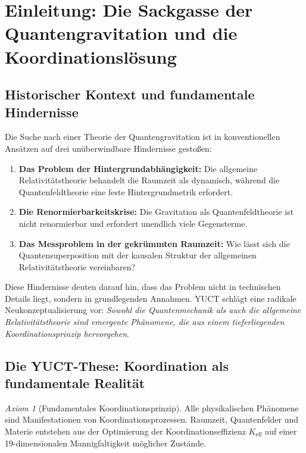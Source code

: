 \documentclass[12pt,a4paper]{article}
\theoremstyle{remark}
\newtheorem{axiom}[theorem]{Axiom}
\newcommand{\Keff}{K_{\mathrm{eff}}}
\begin{document}
	\tableofcontents
	\newpage
	
	\section{Einleitung: Die Sackgasse der Quantengravitation und die Koordinationslösung}
	\label{sec:introduction}
	
	\subsection{Historischer Kontext und fundamentale Hindernisse}
	
	Die Suche nach einer Theorie der Quantengravitation ist in konventionellen Ansätzen auf drei unüberwindbare Hindernisse gestoßen:
	
	\begin{enumerate}
		\item \textbf{Das Problem der Hintergrundabhängigkeit:} Die allgemeine Relativitätstheorie behandelt die Raumzeit als dynamisch, während die Quantenfeldtheorie eine feste Hintergrundmetrik erfordert.
		
		\item \textbf{Die Renormierbarkeitskrise:} Die Gravitation als Quantenfeldtheorie ist nicht renormierbar und erfordert unendlich viele Gegensterme.
		
		\item \textbf{Das Messproblem in der gekrümmten Raumzeit:} Wie lässt sich die Quantensuperposition mit der kausalen Struktur der allgemeinen Relativitätstheorie vereinbaren?
	\end{enumerate}
	
	Diese Hindernisse deuten darauf hin, dass das Problem nicht in technischen Details liegt, sondern in grundlegenden Annahmen. YUCT schlägt eine radikale Neukonzeptualisierung vor: \emph{Sowohl die Quantenmechanik als auch die allgemeine Relativitätstheorie sind emergente Phänomene, die aus einem tieferliegenden Koordinationsprinzip hervorgehen}.
	
	\subsection{Die YUCT-These: Koordination als fundamentale Realität}
	
	\begin{axiom}[Fundamentales Koordinationsprinzip]
		Alle physikalischen Phänomene sind Manifestationen von Koordinationsprozessen. Raumzeit, Quantenfelder und Materie entstehen aus der Optimierung der Koordinationseffizienz $\Keff$ auf einer 19-dimensionalen Mannigfaltigkeit möglicher Zustände.
	\end{axiom}
	
\end{document}
